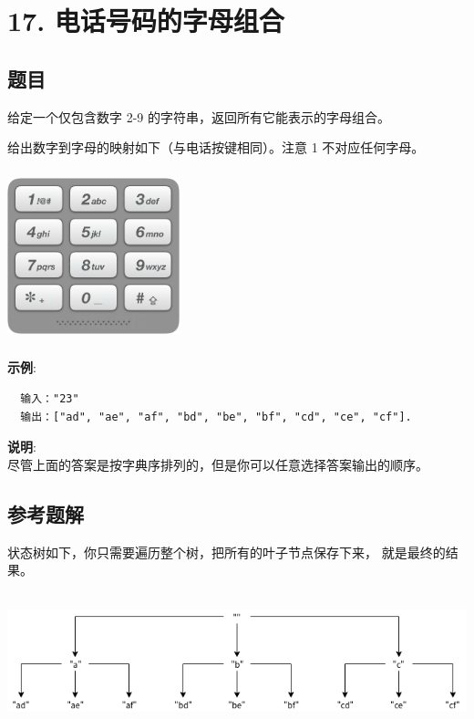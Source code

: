 \newpage
\section{17. 电话号码的字母组合}
\label{leetcode:17}

\subsection{题目}

给定一个仅包含数字 2-9 的字符串，返回所有它能表示的字母组合。

给出数字到字母的映射如下（与电话按键相同）。注意 1 不对应任何字母。

\includegraphics[width=50mm,height=50mm]{images/leetcode/17_telephone_keypad.png}

\textbf{示例}:

\begin{verbatim}
  输入："23"
  输出：["ad", "ae", "af", "bd", "be", "bf", "cd", "ce", "cf"].
\end{verbatim}

\textbf{说明}: \\
尽管上面的答案是按字典序排列的，但是你可以任意选择答案输出的顺序。

\subsection{参考题解}

状态树如下，你只需要遍历整个树，把所有的叶子节点保存下来，
就是最终的结果。

\includegraphics[width=150mm,height=40mm]{images/leetcode/leetcode_17.png}

